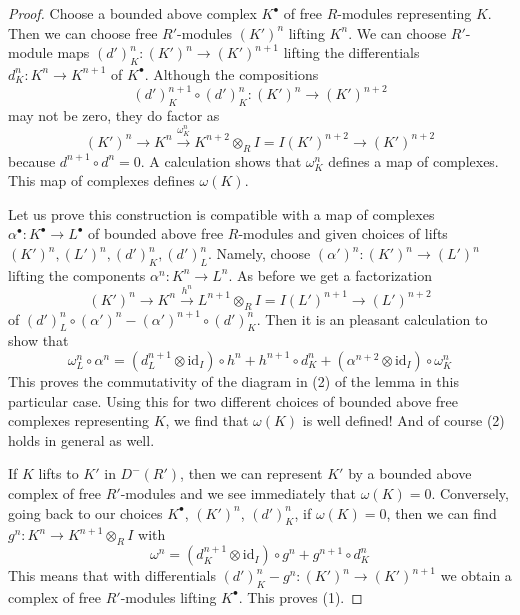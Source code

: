 \begin{proof}
Choose a bounded above complex $K^\bullet$ of free $R$-modules representing
$K$. Then we can choose free $R'$-modules $(K')^n$ lifting $K^n$.
We can choose $R'$-module maps $(d')^n_K : (K')^n \to (K')^{n + 1}$
lifting the differentials $d^n_K : K^n \to K^{n + 1}$ of $K^\bullet$.
Although the compositions
$$
(d')^{n + 1}_K \circ (d')^n_K : (K')^n \to (K')^{n + 2}
$$
may not be zero, they do factor as
$$
(K')^n \to K^n \xrightarrow{\omega^n_K}
K^{n + 2} \otimes_R I = I(K')^{n + 2} \to (K')^{n + 2}
$$
because $d^{n + 1} \circ d^n = 0$.
A calculation shows that $\omega^n_K$ defines a map of complexes.
This map of complexes defines $\omega(K)$.

\medskip\noindent
Let us prove this construction is compatible with a map of complexes
$\alpha^\bullet : K^\bullet \to L^\bullet$ of bounded above free $R$-modules
and given choices of lifts $(K')^n, (L')^n, (d')^n_K, (d')^n_L$.
Namely, choose $(\alpha')^n : (K')^n \to (L')^n$ lifting the
components $\alpha^n : K^n \to L^n$. As before we get a
factorization
$$
(K')^n \to K^n \xrightarrow{h^n}
L^{n + 1} \otimes_R I = I(L')^{n + 1} \to (L')^{n + 2}
$$
of $(d')^n_L \circ (\alpha')^n - (\alpha')^{n + 1} \circ (d')_K^n$.
Then it is an pleasant calculation to show that
$$
\omega^n_L \circ \alpha^n =
(d_L^{n + 1} \otimes \text{id}_I) \circ h^n + h^{n + 1} \circ d_K^n +
(\alpha^{n + 2} \otimes \text{id}_I) \circ \omega^n_K
$$
This proves the commutativity of the diagram in (2) of the lemma
in this particular case. Using this for two different choices
of bounded above free complexes representing $K$, we find that
$\omega(K)$ is well defined! And of course (2) holds in general as well.

\medskip\noindent
If $K$ lifts to $K'$ in $D^-(R')$, then we can represent
$K'$ by a bounded above complex of free $R'$-modules
and we see immediately that $\omega(K) = 0$.
Conversely, going back to our choices $K^\bullet$,
$(K')^n$, $(d')^n_K$, if $\omega(K) = 0$, then we can find
$g^n : K^n \to K^{n + 1} \otimes_R I$ with
$$
\omega^n = (d_K^{n + 1} \otimes \text{id}_I) \circ g^n +
g^{n + 1} \circ d_K^n
$$
This means that with differentials
$(d')^n_K - g^n : (K')^n \to (K')^{n + 1}$
we obtain a complex of free $R'$-modules lifting $K^\bullet$.
This proves (1).


\end{proof}
